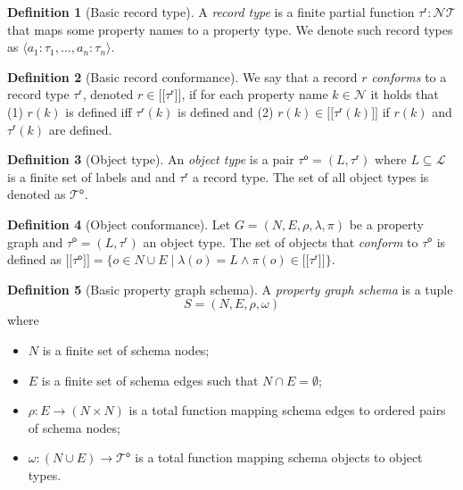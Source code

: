 \documentclass{report}
\makeatletter
\theoremstyle{definition}
\newtheorem{definition}{Definition}
\newcommand{\pto}{}%
\DeclareRobustCommand{\pto}{\mathrel{\mathpalette\p@to@gets\to}}
\newcommand{\p@to@gets}[2]{%
  \ooalign{\hidewidth$\m@th#1\mapstochar\mkern5mu$\hidewidth\cr$\m@th#1\to$\cr}%
}
\newcommand{\ptype}{\tau}
\newcommand{\ptypes}{\mathcal{T}}
\newcommand{\rtype}{\tau^\mathsf{r}}
\newcommand{\otype}{\tau^\mathsf{o}}
\newcommand{\otypes}{\mathcal{T}^\mathsf{o}}
\newcommand{\lsem}{\ensuremath{[\![}}
\newcommand{\rsem}{\ensuremath{]\!]}}
\newcommand{\sem}[1]{\ensuremath{\lsem #1 \rsem}}
\makeatother
\begin{document}
\begin{definition}[Basic record type]
  \label{def:record-type-basic}
  A \emph{record type} is a finite partial function $\rtype : \mathcal{N} \pto \ptypes$ that maps some property names to a property type. We denote such record types as $\langle a_1 : \ptype_1, \ldots, a_n : \ptype_n \rangle$.
\end{definition}

\begin{definition}[Basic record conformance]
  \label{def:record-conformance-basic}
  We say that a record $r$ \emph{conforms} to a record type $\rtype$, denoted $r \in \sem{\rtype}$, if for each property name $k \in \mathcal{N}$ it holds that (1) $r(k)$ is defined iff $\rtype(k)$ is defined and (2) $r(k) \in \sem{\rtype(k)}$ if $r(k)$ and $\rtype(k)$ are defined.
\end{definition}

\begin{definition}[Object type]
  \label{def:object-type}
  An \emph{object type} is a pair $\otype = (L, \rtype)$ where $L \subseteq \mathcal{L}$ is a finite set of labels and and $\rtype$ a record type.
  The set of all object types is denoted as $\otypes$.
\end{definition}

\begin{definition}[Object conformance]
  \label{def:object-conformance}
  Let $G = (N, E, \rho, \lambda, \pi)$ be a property graph and $\otype = (L, \rtype)$ an object type. The set of objects that \emph{conform} to $\otype$ is defined as $\sem{\otype} = \{o \in N \cup E \mid \lambda(o) = L \wedge \pi(o) \in \sem{\rtype}\}$.
\end{definition}

\begin{definition}[Basic property graph schema]
  \label{def:pg-schema-basic}
  A \emph{property graph schema} is a tuple $$S = (N, E, \rho, \omega)$$ where
  \begin{itemize}
    \item $N$ is a finite set of schema nodes;
    \item $E$ is a finite set of schema edges such that $N \cap E = \emptyset$;
    \item $\rho : E \to (N \times N)$ is a total function mapping schema edges to ordered pairs of schema nodes;
    \item $\omega : (N \cup E) \to \otypes$ is a total function mapping schema objects to object types.
  \end{itemize}
\end{definition}
\end{document}
